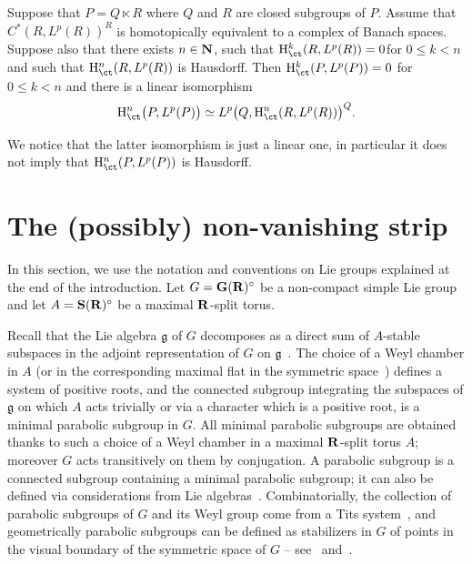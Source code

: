\begin{coro}\label{spectral_cor2}
Suppose that $P = Q \ltimes R$ where $Q$ and $R$ are closed subgroups of $P$. Assume that $C^*(R, L^p(R))^R$ is homotopically equivalent to a complex of Banach spaces. Suppose also that there exists $n \in {\bf N}$, such that ${\rm H}_{\ct} ^k (R, L^p(R)) = 0$\linebreak for $0 \leqslant k < n$ and such that ${\rm H}_{\ct} ^n (R, L^p(R))$ is Hausdorff. Then ${\rm H}_{\ct} ^k (P, L^p(P)) = 0$ for $0 \leqslant k < n$ and there is a linear isomorphism
\[
{\rm H}_{\ct} ^n \big(P, L^p(P)\big) \simeq L^p\bigl(Q, {\rm H}_{\ct} ^n (R, L^p(R))\bigr)^Q.
\]
\end{coro}

We notice that the latter isomorphism is just a linear one, in particular it does not imply that ${\rm H}_{\ct} ^n (P, L^p(P))$ is Hausdorff.


\section{The (possibly) non-vanishing strip}\label{6}

In this section, we use the notation and conventions on Lie groups explained at the end of the introduction. Let $G = {\bf G}({\bf R})^\circ$ be a non-compact simple Lie group and let $A = {\bf S}({\bf R})^\circ$ be a maximal ${\bf R}$-split torus.

Recall that the Lie algebra $\mathfrak{g}$ of $G$ decomposes as a direct sum of $A$-stable subspaces in the adjoint representation of $G$ on $\mathfrak{g}$~\cite[3.5]{Borel-LAG}. The choice of a Weyl chamber in $A$ (or in the corresponding maximal flat in the symmetric space~\cite[6.4]{Maubon}) defines a system of positive roots, and the connected subgroup integrating the subspaces of $\mathfrak{g}$ on which $A$ acts trivially or via a character which is a positive root, is a minimal parabolic subgroup in $G$. All minimal parabolic subgroups are obtained thanks to such a choice of a Weyl chamber in a maximal ${\bf R}$-split torus $A$; moreover $G$ acts transitively on them by conjugation. A parabolic subgroup is a connected subgroup containing a minimal parabolic subgroup; it can also be defined via considerations from Lie algebras~\cite[VII.7]{Knapp}. Combinatorially, the collection of parabolic subgroups of $G$ and its Weyl group come from a Tits system~\cite[\textsection~21 and \textsection~24.C]{Borel-LAG}, and geometrically parabolic subgroups can be defined as stabilizers in $G$ of points in the visual boundary of the symmetric space of $G$ -- see~\cite[6.6]{Maubon} and~\cite{BS}.

